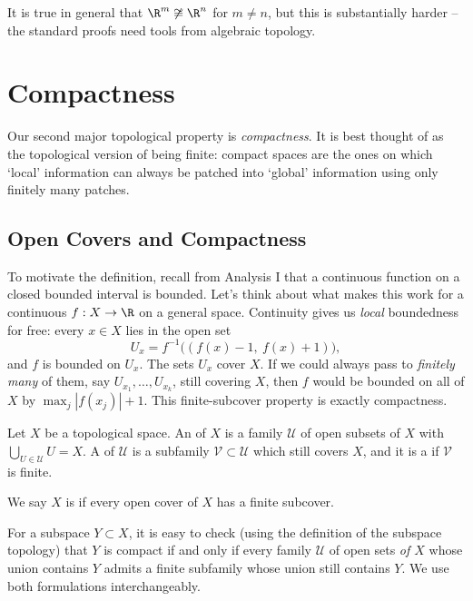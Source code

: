 \begin{remark}
    It is true in general that $\R^m \not\cong \R^n$ for $m \neq n$, but this is substantially harder -- the standard proofs need tools from algebraic topology.
\end{remark}

\section{Compactness}

Our second major topological property is \emph{compactness}. It is best thought of as the topological version of being finite: compact spaces are the ones on which `local' information can always be patched into `global' information using only finitely many patches.

\subsection{Open Covers and Compactness}

To motivate the definition, recall from Analysis I that a continuous function on a closed bounded interval is bounded. Let's think about what makes this work for a continuous $f: X \rightarrow \R$ on a general space. Continuity gives us \emph{local} boundedness for free: every $x \in X$ lies in the open set
$$
U_x = f^{-1}\big((f(x) - 1,\ f(x) + 1)\big),
$$
and $f$ is bounded on $U_x$. The sets $U_x$ cover $X$. If we could always pass to \emph{finitely many} of them, say $U_{x_1}, \dots, U_{x_k}$, still covering $X$, then $f$ would be bounded on all of $X$ by $\max_j |f(x_j)| + 1$. This finite-subcover property is exactly compactness.

\begin{definition}
    Let $X$ be a topological space. An  of $X$ is a family $\mathcal{U}$ of open subsets of $X$ with $\bigcup_{U \in \mathcal{U}} U = X$. A  of $\mathcal{U}$ is a subfamily $\mathcal{V} \subset \mathcal{U}$ which still covers $X$, and it is a  if $\mathcal{V}$ is finite.

    We say $X$ is  if every open cover of $X$ has a finite subcover.
\end{definition}

For a subspace $Y \subset X$, it is easy to check (using the definition of the subspace topology) that $Y$ is compact if and only if every family $\mathcal{U}$ of open sets \emph{of $X$} whose union contains $Y$ admits a finite subfamily whose union still contains $Y$. We use both formulations interchangeably.

